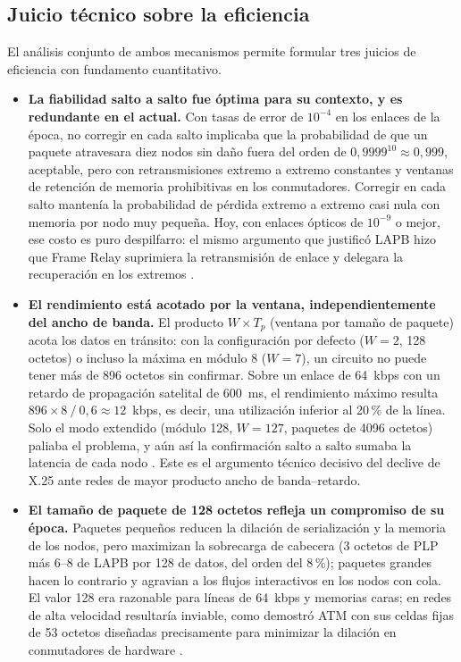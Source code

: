 \documentclass[12pt,a4paper]{article}
\begin{document}
\subsection{Juicio técnico sobre la eficiencia}

El análisis conjunto de ambos mecanismos permite formular tres juicios de eficiencia con fundamento cuantitativo.

\begin{itemize}
    \item \textbf{La fiabilidad salto a salto fue óptima para su contexto, y es redundante en el actual.} Con tasas de error de $10^{-4}$ en los enlaces de la época, no corregir en cada salto implicaba que la probabilidad de que un paquete atravesara diez nodos sin daño fuera del orden de $0{,}9999^{10}\approx 0{,}999$, aceptable, pero con retransmisiones extremo a extremo constantes y ventanas de retención de memoria prohibitivas en los conmutadores. Corregir en cada salto mantenía la probabilidad de pérdida extremo a extremo casi nula con memoria por nodo muy pequeña. Hoy, con enlaces ópticos de $10^{-9}$ o mejor, ese costo es puro despilfarro: el mismo argumento que justificó LAPB hizo que Frame Relay suprimiera la retransmisión de enlace y delegara la recuperación en los extremos \cite{stallings2004, tanenbaum2012}.
    \item \textbf{El rendimiento está acotado por la ventana, independientemente del ancho de banda.} El producto $W \times T_p$ (ventana por tamaño de paquete) acota los datos en tránsito: con la configuración por defecto ($W=2$, 128 octetos) o incluso la máxima en módulo 8 ($W=7$), un circuito no puede tener más de 896 octetos sin confirmar. Sobre un enlace de 64~kbps con un retardo de propagación satelital de 600~ms, el rendimiento máximo resulta $896\times 8\ /\ 0{,}6 \approx 12$~kbps, es decir, una utilización inferior al 20\,\% de la línea. Solo el modo extendido (módulo 128, $W=127$, paquetes de 4096 octetos) paliaba el problema, y aún así la confirmación salto a salto sumaba la latencia de cada nodo \cite{bertsekas1992, schwartz1987}. Este es el argumento técnico decisivo del declive de X.25 ante redes de mayor producto ancho de banda--retardo.
    \item \textbf{El tamaño de paquete de 128 octetos refleja un compromiso de su época.} Paquetes pequeños reducen la dilación de serialización y la memoria de los nodos, pero maximizan la sobrecarga de cabecera (3 octetos de PLP más 6--8 de LAPB por 128 de datos, del orden del 8\,\%); paquetes grandes hacen lo contrario y agravian a los flujos interactivos en los nodos con cola. El valor 128 era razonable para líneas de 64~kbps y memorias caras; en redes de alta velocidad resultaría inviable, como demostró ATM con sus celdas fijas de 53 octetos diseñadas precisamente para minimizar la dilación en conmutadores de hardware \cite{tanenbaum2012, stallings2004}.
\end{itemize}
\end{document}
